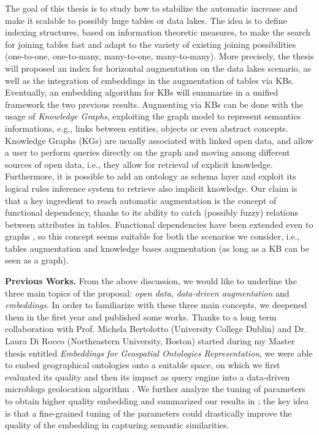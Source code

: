 The goal of this thesis is to study how to stabilize the automatic increase and make it scalable to possibly huge tables or data lakes. The idea is to define indexing structures, based on information theoretic measures, to make the search for joining tables fast and adapt to the variety of existing joining possibilities (one-to-one, one-to-many, many-to-one, many-to-many). More precisely, the thesis will proposed an index for horizontal augmentation on the data lakes scenario, as well as the integration of embeddings in the augmentation of tables via KBs. Eventually, an embedding algorithm for KBs will summarize in a unified framework the two previous results. Augmenting via KBs can be done with the usage of \textit{Knowledge Graphs}, exploiting the graph model to represent semantics informations, e.g., links between entities, objects or even abstract concepts. Knowledge Graphs (KGs) are usually associated with linked open data, and allow a user to perform queries directly on the graph and moving among different sources of open data, i.e., they allow for retrieval of explicit knowledge. Furthermore, it is possible to add an ontology as schema layer and exploit its logical rules inference system to retrieve also implicit knowledge.
Our claim is that a key ingredient to reach automatic augmentation is the concept of functional dependency, thanks to its ability to catch (possibly fuzzy) relations between attributes in tables. Functional dependencies have been extended even to graphs \cite{fan2016functional}, so this concept seems suitable for both the scenarios we consider, i.e., tables augmentation and knowledge bases augmentation (as long as a KB can be seen as a graph). 


\bigbreak
\textbf{Previous Works.} From the above discussion, we would like to underline the three main topics of the proposal: \textit{open data}, \textit{data-driven augmentation} and \textit{embeddings}. In order to familiarize with these three main concepts, we deepened them in the first year and published some works. Thanks to a long term collaboration with Prof. Michela Bertolotto (University College Dublin) and Dr. Laura Di Rocco (Northeastern University, Boston) started during my Master thesis entitled \textit{Embeddings for Geospatial Ontologies Representation}, we were able to embed geographical ontologies onto a suitable space, on which we first evaluated its quality \cite{dassereto2019evaluating} and then its impact as query engine into a data-driven microblogs geolocation algorithm \cite{di2020sherloc}. We further analyze the tuning of parameters to obtain higher quality embedding and summarized our results in \cite{dassereto2020tuning}; the key idea is that a fine-grained tuning of the parameters could drastically improve the quality of the embedding in capturing semantic similarities.

